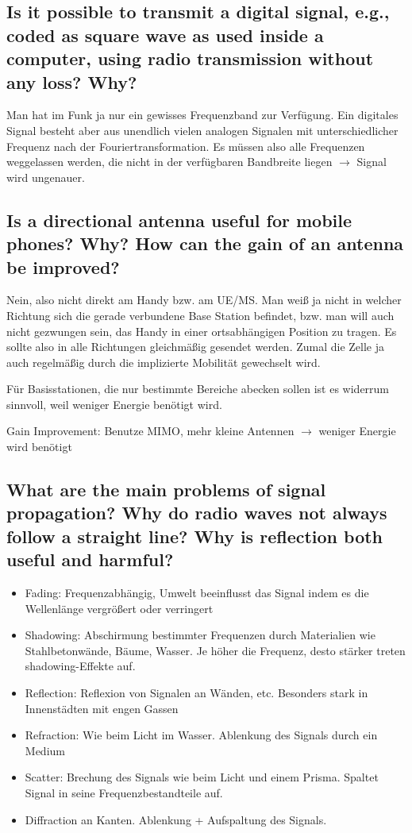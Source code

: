 \subsection{Is it possible to transmit a digital signal, e.g., coded as square wave as used inside a
computer, using radio transmission without any loss? Why?}
Man hat im Funk ja nur ein gewisses Frequenzband zur Verfügung. Ein digitales Signal besteht aber aus unendlich vielen analogen Signalen mit unterschiedlicher Frequenz nach der Fouriertransformation. Es müssen also alle Frequenzen weggelassen werden, die nicht in der verfügbaren Bandbreite liegen $\rightarrow$ Signal wird ungenauer.

\subsection{Is a directional antenna useful for mobile phones? Why? How can the gain of an
antenna be improved?} 
Nein, also nicht direkt am Handy bzw. am UE/MS. Man weiß ja nicht in welcher Richtung sich die gerade verbundene Base Station befindet, bzw. man will auch nicht gezwungen sein, das Handy in einer ortsabhängigen Position zu tragen. Es sollte also in alle Richtungen gleichmäßig gesendet werden. Zumal die Zelle ja auch regelmäßig durch die implizierte Mobilität gewechselt wird.

Für Basisstationen, die nur bestimmte Bereiche abecken sollen ist es widerrum sinnvoll, weil weniger Energie benötigt wird.

Gain Improvement: Benutze MIMO, mehr kleine Antennen $\rightarrow$ weniger Energie wird benötigt

\subsection{What are the main problems of signal propagation? Why do radio waves not always
follow a straight line? Why is reflection both useful and harmful?}
\begin{itemize}

\item Fading: Frequenzabhängig, Umwelt beeinflusst das Signal indem es die Wellenlänge vergrößert oder verringert

\item Shadowing: Abschirmung bestimmter Frequenzen durch Materialien wie Stahlbetonwände, Bäume, Wasser. Je höher die Frequenz, desto stärker treten shadowing-Effekte auf.

\item Reflection: Reflexion von Signalen an Wänden, etc. Besonders stark in Innenstädten mit engen Gassen

\item Refraction: Wie beim Licht im Wasser. Ablenkung des Signals durch ein Medium

\item Scatter: Brechung des Signals wie beim Licht und einem Prisma. Spaltet Signal in seine Frequenzbestandteile auf.

\item Diffraction an Kanten. Ablenkung + Aufspaltung des Signals.

\end{itemize}

